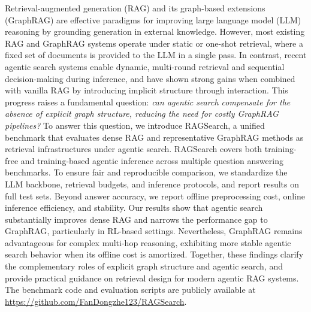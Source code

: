 Retrieval-augmented generation (RAG) and its graph-based extensions (GraphRAG) are effective paradigms for improving large language model (LLM) reasoning by grounding generation in external knowledge. However, most existing RAG and GraphRAG systems operate under static or one-shot retrieval, where a fixed set of documents is provided to the LLM in a single pass. In contrast, recent agentic search systems enable dynamic, multi-round retrieval and sequential decision-making during inference, and have shown strong gains when combined with vanilla RAG by introducing implicit structure through interaction.
This progress raises a fundamental question: \textit{can agentic search compensate for the absence of explicit graph structure, reducing the need for costly GraphRAG pipelines?}
To answer this question, we introduce RAGSearch, a unified benchmark that evaluates dense RAG and representative GraphRAG methods as retrieval infrastructures under agentic search. RAGSearch covers both training-free and training-based agentic inference across multiple question answering benchmarks. To ensure fair and reproducible comparison, we standardize the LLM backbone, retrieval budgets, and inference protocols, and report results on full test sets. Beyond answer accuracy, we report offline preprocessing cost, online inference efficiency, and stability. Our results show that agentic search substantially improves dense RAG and narrows the performance gap to GraphRAG, particularly in RL-based settings. Nevertheless, GraphRAG remains advantageous for complex multi-hop reasoning, exhibiting more stable agentic search behavior when its offline cost is amortized. Together, these findings clarify the complementary roles of explicit graph structure and agentic search, and provide practical guidance on retrieval design for modern agentic RAG systems.
The benchmark code and evaluation scripts are publicly available at \href{https://github.com/FanDongzhe123/RAGSearch}{https://github.com/FanDongzhe123/RAGSearch}.

